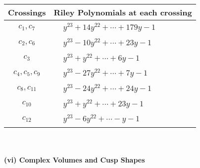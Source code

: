\documentclass[1p]{elsarticle_modified}
\theoremstyle{definition}
\begin{document}
\begin{tabular}{m{50pt}|m{274pt}}
Crossings & \hspace{64pt}Riley Polynomials at each crossing \\
\hline $$\begin{aligned}c_{1},c_{7}\end{aligned}$$&$\begin{aligned}
&y^{23}+14 y^{22}+\cdots+179 y-1
\end{aligned}$\\
\hline $$\begin{aligned}c_{2},c_{6}\end{aligned}$$&$\begin{aligned}
&y^{23}-10 y^{22}+\cdots+23 y-1
\end{aligned}$\\
\hline $$\begin{aligned}c_{3}\end{aligned}$$&$\begin{aligned}
&y^{23}+y^{22}+\cdots+6 y-1
\end{aligned}$\\
\hline $$\begin{aligned}c_{4},c_{5},c_{9}\end{aligned}$$&$\begin{aligned}
&y^{23}-27 y^{22}+\cdots+7 y-1
\end{aligned}$\\
\hline $$\begin{aligned}c_{8},c_{11}\end{aligned}$$&$\begin{aligned}
&y^{23}-24 y^{22}+\cdots+24 y-1
\end{aligned}$\\
\hline $$\begin{aligned}c_{10}\end{aligned}$$&$\begin{aligned}
&y^{23}+y^{22}+\cdots+23 y-1
\end{aligned}$\\
\hline $$\begin{aligned}c_{12}\end{aligned}$$&$\begin{aligned}
&y^{23}-6 y^{22}+\cdots- y-1
\end{aligned}$\\
\hline
\end{tabular}\\~\\
\newpage\flushleft \textbf{(vi) Complex Volumes and Cusp Shapes}
\end{document}

